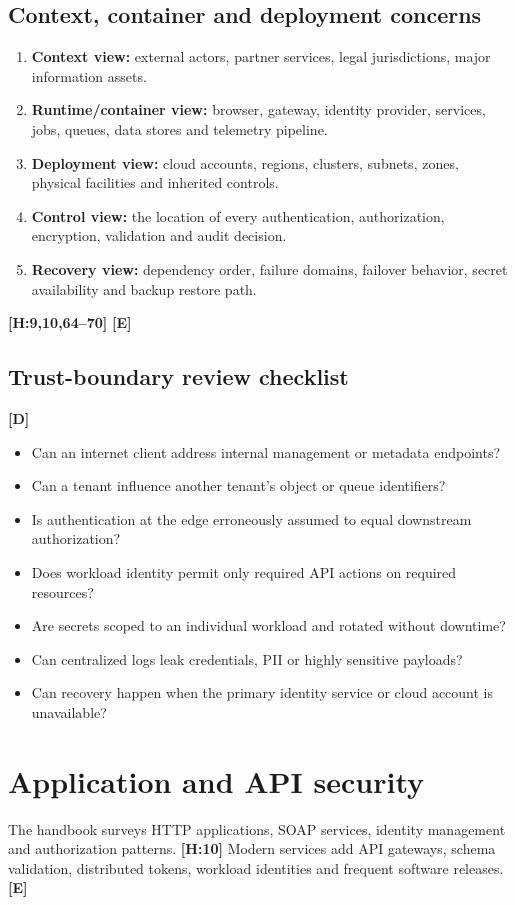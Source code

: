 \documentclass[10pt,letterpaper,oneside]{article}
\newcommand{\handbookref}[1]{\textsf{\color{accent}\textbf{[H:#1]}}}
\newcommand{\modernext}{\textsf{\color{muted}\textbf{[E]}}}
\newcommand{\designed}{\textsf{\color{accent}\textbf{[D]}}}
\begin{document}
\subsection{Context, container and deployment concerns}
\begin{enumerate}
\item \textbf{Context view:} external actors, partner services, legal jurisdictions, major information assets.
\item \textbf{Runtime/container view:} browser, gateway, identity provider, services, jobs, queues, data stores and telemetry pipeline.
\item \textbf{Deployment view:} cloud accounts, regions, clusters, subnets, zones, physical facilities and inherited controls.
\item \textbf{Control view:} the location of every authentication, authorization, encryption, validation and audit decision.
\item \textbf{Recovery view:} dependency order, failure domains, failover behavior, secret availability and backup restore path.
\end{enumerate}
\handbookref{9,10,64--70} \modernext{}

\subsection{Trust-boundary review checklist}\designed{}
\begin{itemize}
\item Can an internet client address internal management or metadata endpoints?
\item Can a tenant influence another tenant's object or queue identifiers?
\item Is authentication at the edge erroneously assumed to equal downstream authorization?
\item Does workload identity permit only required API actions on required resources?
\item Are secrets scoped to an individual workload and rotated without downtime?
\item Can centralized logs leak credentials, PII or highly sensitive payloads?
\item Can recovery happen when the primary identity service or cloud account is unavailable?
\end{itemize}

\section{Application and API security}
The handbook surveys HTTP applications, SOAP services, identity management and authorization patterns. \handbookref{10} Modern services add API gateways, schema validation, distributed tokens, workload identities and frequent software releases. \modernext{}
\end{document}
